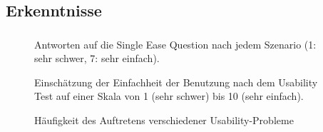 \subsection{Erkenntnisse}
\begin{frame}
  \frametitle{\currentsectionname}

  \begin{figure}
    
    \caption{Antworten auf die Single Ease Question nach jedem Szenario (1: sehr schwer, 7: sehr einfach).}
  \end{figure}

  \note{
    \begin{itemize}
    \end{itemize}
  }

\end{frame}

\begin{frame}

  \begin{figure}
    
    \caption{Einschätzung der Einfachheit der Benutzung nach dem Usability Test auf einer Skala von 1 (sehr schwer) bis 10 (sehr einfach).}
  \end{figure}

\end{frame}

\begin{frame}

  \begin{figure}
    
    \caption{Häufigkeit des Auftretens verschiedener Usability-Probleme}
  \end{figure}

\end{frame}
